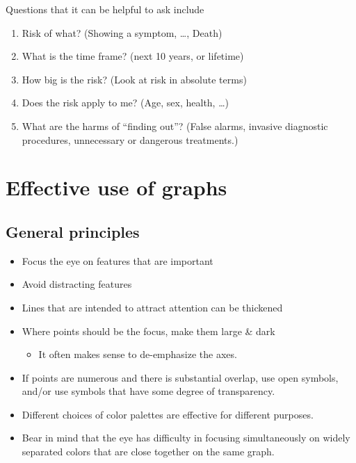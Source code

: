 \documentclass[
  10ptls,
  b5paper]{book}
\providecommand{\tightlist}{%
  \setlength{\itemsep}{0pt}\setlength{\parskip}{0pt}}
\begin{document}
Questions that it can be helpful to ask include

\begin{enumerate}
\def\labelenumi{\arabic{enumi}.}
\tightlist
\item
  Risk of what? (Showing a symptom, \ldots, Death)
\item
  What is the time frame? (next 10 years, or lifetime)
\item
  How big is the risk? (Look at risk in absolute terms)
\item
  Does the risk apply to me? (Age, sex, health, \ldots)
\item
  What are the harms of ``finding out''? (False alarms, invasive diagnostic procedures, unnecessary or dangerous treatments.)
\end{enumerate}

\hypertarget{effective-use-of-graphs}{%
\chapter{Effective use of graphs}\label{effective-use-of-graphs}}

\hypertarget{general-principles}{%
\section{General principles}\label{general-principles}}

\begin{itemize}
\tightlist
\item
  Focus the eye on features that are important
\item
  Avoid distracting features
\item
  Lines that are intended to attract attention can be
  thickened
\item
  Where points should be the focus, make them large \& dark

  \begin{itemize}
  \tightlist
  \item
    It often makes sense to de-emphasize the axes.
  \end{itemize}
\item
  If points are numerous and there is substantial overlap,
  use open symbols, and/or use symbols that have some
  degree of transparency.
\item
  Different choices of color palettes are effective for different purposes.
\item
  Bear in mind that the eye has difficulty in focusing
  simultaneously on widely separated colors that are close
  together on the same graph.
\end{itemize}
\end{document}
